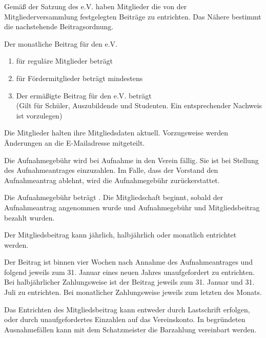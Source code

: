 \documentclass[parskip=half]{scrartcl}
\begin{document}
\begin{contract}

Gemäß der Satzung des \associationName{} e.V. haben Mitglieder die von der Mitgliederversammlung festgelegten Beiträge zu entrichten. Das Nähere bestimmt die nachstehende Beitragsordnung. 

\Clause[title={Beiträge}]

Der monatliche Beitrag für den \associationName{} e.V.
\begin{enumerate}
  \item für reguläre Mitglieder beträgt \membershipFeeTierThree{}
  \item für Fördermitglieder beträgt mindestens \membershipFeeTierTwo{}
  \item Der ermäßigte Beitrag für den \associationName{} e.V. beträgt \membershipFeeTierOne{}\\
  (Gilt für Schüler, Auszubildende und Studenten. Ein entsprechender Nachweis ist vorzulegen)
\end{enumerate}

Die Mitglieder halten ihre Mitgliedsdaten aktuell. Vorzugsweise werden Änderungen an die E-Mailadresse \contactMail{} mitgeteilt.

\Clause[title={Aufnahmegebühr}]

Die Aufnahmegebühr wird bei Aufnahme in den Verein fällig. Sie ist bei Stellung des Aufnahmeantrages einzuzahlen. Im Falle, dass der Vorstand den Aufnahmeantrag ablehnt, wird die Aufnahmegebühr zurückerstattet.

Die Aufnahmegebühr beträgt \admissionFee{}. Die Mitgliedschaft beginnt, sobald der Aufnahmeantrag angenommen wurde und Aufnahmegebühr und Mitgliedsbeitrag bezahlt wurden.

\Clause[title={Entrichtung der Beiträge}]

Der Mitgliedsbeitrag kann jährlich, halbjährlich oder monatlich entrichtet werden.

Der Beitrag ist binnen vier Wochen nach Annahme des Aufnahmeantrages und folgend jeweils zum 31. Januar eines neuen Jahres unaufgefordert zu entrichten. Bei halbjährlicher Zahlungsweise ist der Beitrag jeweils zum 31. Januar und 31. Juli zu entrichten. Bei monatlicher Zahlungsweise jeweils zum letzten des Monats.  

Das Entrichten des Mitgliedsbeitrag kann entweder durch Lastschrift erfolgen, oder durch unaufgefordertes Einzahlen auf das Vereinskonto. In begründeten Ausnahmefällen kann mit dem Schatzmeister die Barzahlung vereinbart werden.


\end{contract}
\end{document}
